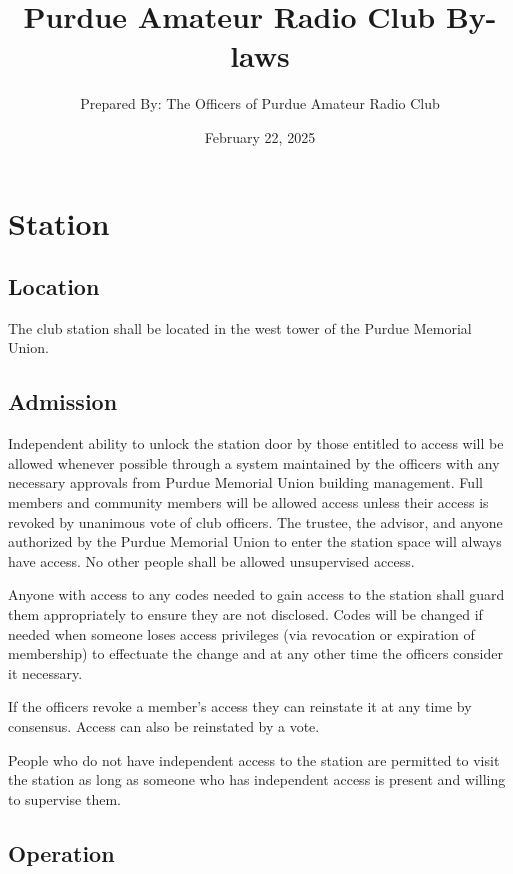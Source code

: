 \documentclass{article}
\title{\vspace*{\fill}Purdue Amateur Radio Club By-laws}
\author{Prepared By: The Officers of Purdue Amateur Radio Club}
\date{February 22, 2025\vspace*{\fill}\vspace*{\fill}}
\begin{document}
\maketitle
\newpage

\tableofcontents
\newpage

\section{Station}

\subsection{Location}

The club station shall be located in the west tower of the Purdue Memorial
Union.

\subsection{Admission}

Independent ability to unlock the station door by those entitled to access will
be allowed whenever possible through a system maintained by the officers with
any necessary approvals from Purdue Memorial Union building management. Full
members and community members will be allowed access unless their access is
revoked by unanimous vote of club officers. The trustee, the advisor, and anyone
authorized by the Purdue Memorial Union to enter the station space will always
have access. No other people shall be allowed unsupervised access.

Anyone with access to any codes needed to gain access to the station shall guard
them appropriately to ensure they are not disclosed. Codes will be changed if
needed when someone loses access privileges (via revocation or expiration of
membership) to effectuate the change and at any other time the officers consider
it necessary.

If the officers revoke a member's access they can reinstate it at any time by
consensus. Access can also be reinstated by a vote.

People who do not have independent access to the station are permitted to visit
the station as long as someone who has independent access is present and willing
to supervise them.

\subsection{Operation}
\end{document}

